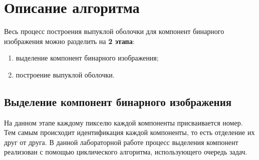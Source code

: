 \section{Описание алгоритма}
Весь процесс построения выпуклой оболочки для компонент бинарного изображения можно разделить на \textbf{2 этапа}:
\begin{enumerate}
	\item выделение компонент бинарного изображения;
	\item построение выпуклой оболочки.
\end{enumerate}
\subsection{Выделение компонент бинарного изображения}
На данном этапе каждому пикселю каждой компоненты присваивается номер. Тем самым происходит идентификация каждой компоненты, то есть отделение их друг от друга.\n
В данной лабораторной работе процесс выделения компонент реализован с помощью циклического алгоритма, использующего очередь задач.
